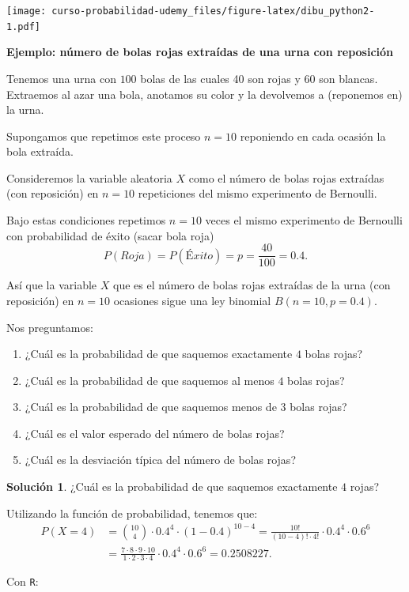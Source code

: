 \documentclass[]{book}
\providecommand{\tightlist}{%
  \setlength{\itemsep}{0pt}\setlength{\parskip}{0pt}}
\begin{document}
\texttt{[image: curso-probabilidad-udemy\_files/figure-latex/dibu\_python2-1.pdf]}

\textbf{Ejemplo: número de bolas rojas extraídas de una urna con reposición}

Tenemos una urna con \(100\) bolas de las cuales 40 son rojas y 60 son blancas. Extraemos al azar una bola, anotamos su color y la devolvemos a (reponemos en) la urna.

Supongamos que repetimos este proceso \(n=10\) reponiendo en cada ocasión la bola extraída.

Consideremos la variable aleatoria \(X\) como el número de bolas rojas extraídas (con reposición) en \(n=10\) repeticiones del mismo experimento de Bernoulli.

Bajo estas condiciones repetimos \(n=10\) veces el mismo experimento de Bernoulli con probabilidad de éxito (sacar bola roja)
\[P(Roja)=P(Éxito)=p=\frac{40}{100}=0.4.\]

Así que la variable \(X\) que es el número de bolas rojas extraídas de la urna (con reposición) en \(n=10\) ocasiones sigue una ley binomial \(B(n=10,p=0.4).\)

Nos preguntamos:

\begin{enumerate}
\def\labelenumi{\arabic{enumi}.}
\tightlist
\item
  ¿Cuál es la probabilidad de que saquemos exactamente \(4\) bolas rojas?
\item
  ¿Cuál es la probabilidad de que saquemos al menos \(4\) bolas rojas?
\item
  ¿Cuál es la probabilidad de que saquemos menos de \(3\) bolas rojas?
\item
  ¿Cuál es el valor esperado del número de bolas rojas?
\item
  ¿Cuál es la desviación típica del número de bolas rojas?
\end{enumerate}

\textbf{Solución 1}. ¿Cuál es la probabilidad de que saquemos exactamente \(4\) rojas?

Utilizando la función de probabilidad, tenemos que:
\[
\begin{array}{ll}
P(X=4)&={10\choose 4}\cdot 0.4^4\cdot (1-0.4)^{10-4}
= \frac{10!}{(10-4)!\cdot 4!}\cdot 0.4^4\cdot 0.6^6\\
&= \frac{7\cdot 8\cdot 9\cdot 10}{1\cdot 2\cdot 3\cdot 4}\cdot 0.4^4\cdot 0.6^6=0.2508227.
\end{array}
\]

Con \texttt{R}:
\end{document}
